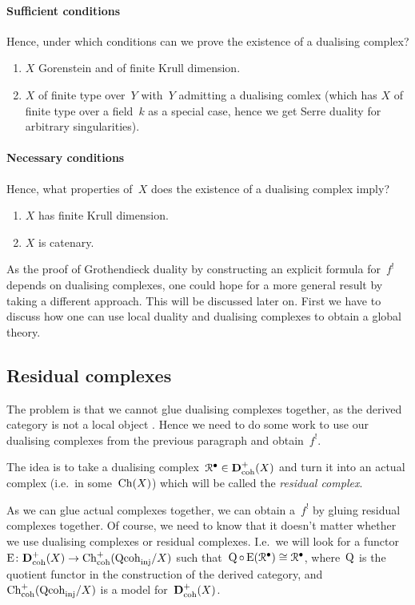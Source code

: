 \documentclass[10pt,a4paper]{article}
\begin{document}
\paragraph{Sufficient conditions}
Hence, under which conditions can we prove the existence of a dualising complex?
\begin{enumerate}
  \item $X$ Gorenstein and of finite Krull dimension.
  \item $X$ of finite type over~$Y$ with~$Y$ admitting a dualising comlex (which has $X$ of finite type over a field~$k$ as a special case, hence we get Serre duality for arbitrary singularities).
\end{enumerate}
\paragraph{Necessary conditions}
Hence, what properties of~$X$ does the existence of a dualising complex imply?
\begin{enumerate}
  \item $X$ has finite Krull dimension.
  \item $X$ is catenary.
\end{enumerate}
As the proof of Grothendieck duality by constructing an explicit formula for~$f^!$ depends on dualising complexes, one could hope for a more general result by taking a different approach. This will be discussed later on. First we have to discuss how one can use local duality and dualising complexes to obtain a global theory.

\subsection{Residual complexes}
\label{subsection:residual-complexes}
The problem is that we cannot glue dualising complexes together, as the derived category is not a local object \addreference. Hence we need to do some work to use our dualising complexes from the previous paragraph and obtain~$f^!$.

The idea is to take a dualising complex~$\mathcal{R}^\bullet\in\mathbf{D}_{\mathrm{coh}}^+(X)$ and turn it into an actual complex (i.e.\ in some~$\operatorname{Ch}(X)$) which will be called the \emph{residual complex}.

As we can glue actual complexes together, we can obtain a~$f^!$ by gluing residual complexes together. Of course, we need to know that it doesn't matter whether we use dualising complexes or residual complexes. I.e.\ we will look for a functor~$\operatorname{E}\colon\mathbf{D}_{\mathrm{coh}}^+(X)\to\operatorname{Ch}_{\mathrm{coh}}^+(\mathrm{Qcoh}_{\mathrm{inj}}/X)$ such that~$\operatorname{Q}\circ\operatorname{E}(\mathcal{R}^\bullet)\cong\mathcal{R}^\bullet$, where~$\operatorname{Q}$ is the quotient functor in the construction of the derived category, and~$\operatorname{Ch}_{\mathrm{coh}}^+(\mathrm{Qcoh}_{\mathrm{inj}}/X)$ is a model for~$\mathbf{D}_{\mathrm{coh}}^+(X)$.
\end{document}
